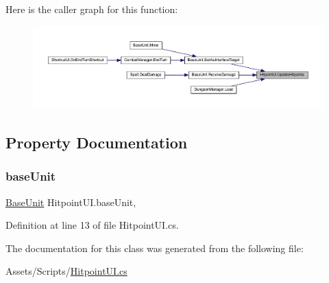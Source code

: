 Here is the caller graph for this function\+:
\nopagebreak
\begin{figure}[H]
\begin{center}
\leavevmode
\includegraphics[width=350pt]{class_hitpoint_u_i_a276f8fb6a38204f4155f32c48c6322af_icgraph}
\end{center}
\end{figure}


\subsection{Property Documentation}
\mbox{\label{class_hitpoint_u_i_a6dfd0f75896f8f70dc7f2dc0ff34fb42}} 
\subsubsection{\texorpdfstring{baseUnit}{baseUnit}}
{\footnotesize\ttfamily \mbox{\hyperlink{class_base_unit}{Base\+Unit}} Hitpoint\+U\+I.\+base\+Unit\hspace{0.3cm}{\ttfamily [get]}, {\ttfamily [set]}}



Definition at line 13 of file Hitpoint\+U\+I.\+cs.



The documentation for this class was generated from the following file\+:\begin{DoxyCompactItemize}
\item 
Assets/\+Scripts/\mbox{\hyperlink{_hitpoint_u_i_8cs}{Hitpoint\+U\+I.\+cs}}\end{DoxyCompactItemize}
